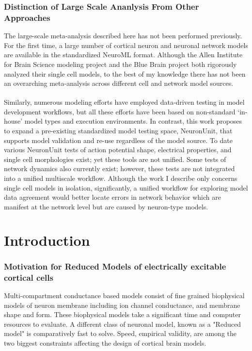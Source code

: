 \subsection{Distinction of Large Scale Ananlysis From Other Approaches}
The large-scale meta-analysis described here has not been performed previously. For the first time, a large number of cortical neuron and neuronal network models are available in the standardized NeuroML format. Although the Allen Institute for Brain Science modeling project and the Blue Brain project both rigorously analyzed their single cell models, to the best of my knowledge there has not been an overarching meta-analysis across different cell and network model sources.\\
\\
Similarly, numerous modeling efforts have employed data-driven testing in model development workflows, but all these efforts have been based on non-standard ‘in-house’ model types and execution environments. In contrast, this work proposes to expand a pre-existing standardized model testing space, NeuronUnit, that supports model validation and re-use regardless of the model source. To date various NeuronUnit tests of action potential shape, electrical properties, and single cell morphologies exist; yet these tools are not unified. Some tests of network dynamics also currently exist; however, these tests are not integrated into a unified multiscale workflow. Although the work I describe only concerns single cell models in isolation, significantly, a unified workflow for exploring model data agreement would better locate errors in network behavior which are manifest at the network level but are caused by neuron-type models. \newline
\newline

\chapter{Introduction}

\subsection*{Motivation for Reduced Models of electrically excitable cortical cells}

Multi-compartment conductance based models consist of fine grained biophysical models of neuron membrane including ion channel conductance, and membrane shape and form. These biophysical models take a significant time and computer resources to evaluate. A different class of neuronal model, known as a "Reduced model" is comparatively fast to solve. Speed, empirical validity, are among the two biggest constraints affecting the design of cortical brain models. 

